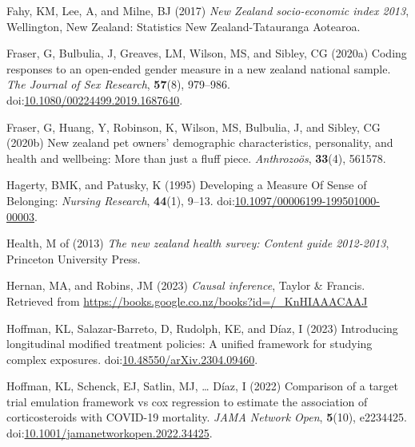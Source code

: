 \documentclass[
  singlecolumn,
  9pt]{article}
\newlength{\cslhangindent}
\newlength{\cslentryspacingunit} %
\newenvironment{CSLReferences}[2] %
 {%
  \setlength{\parindent}{0pt}
  \ifodd #1
  \let\oldpar\par
  \def\par{\hangindent=\cslhangindent\oldpar}
  \fi
  \setlength{\parskip}{#2\cslentryspacingunit}
 }%
 {}
\begin{document}
\begin{CSLReferences}{1}{0}
\leavevmode{}%
Fahy, KM, Lee, A, and Milne, BJ (2017) \emph{New Zealand socio-economic
index 2013}, Wellington, New Zealand: Statistics New Zealand-Tatauranga
Aotearoa.

\leavevmode{}%
Fraser, G, Bulbulia, J, Greaves, LM, Wilson, MS, and Sibley, CG (2020a)
Coding responses to an open-ended gender measure in a new zealand
national sample. \emph{The Journal of Sex Research}, \textbf{57}(8),
979--986.
doi:\href{https://doi.org/10.1080/00224499.2019.1687640}{10.1080/00224499.2019.1687640}.

\leavevmode{}%
Fraser, G, Huang, Y, Robinson, K, Wilson, MS, Bulbulia, J, and Sibley,
CG (2020b) New zealand pet owners{'} demographic characteristics,
personality, and health and wellbeing: More than just a fluff piece.
\emph{Anthrozoös}, \textbf{33}(4), 561578.

\leavevmode{}%
Hagerty, BMK, and Patusky, K (1995) Developing a Measure Of Sense of
Belonging: \emph{Nursing Research}, \textbf{44}(1), 9--13.
doi:\href{https://doi.org/10.1097/00006199-199501000-00003}{10.1097/00006199-199501000-00003}.

\leavevmode{}%
Health, M of (2013) \emph{The new zealand health survey: Content guide
2012-2013}, Princeton University Press.

\leavevmode{}%
Hernan, MA, and Robins, JM (2023) \emph{Causal inference}, Taylor \&
Francis. Retrieved from
\url{https://books.google.co.nz/books?id=/_KnHIAAACAAJ}

\leavevmode{}%
Hoffman, KL, Salazar-Barreto, D, Rudolph, KE, and Díaz, I (2023)
Introducing longitudinal modified treatment policies: A unified
framework for studying complex exposures.
doi:\href{https://doi.org/10.48550/arXiv.2304.09460}{10.48550/arXiv.2304.09460}.

\leavevmode{}%
Hoffman, KL, Schenck, EJ, Satlin, MJ, \ldots{} Díaz, I (2022) Comparison
of a target trial emulation framework vs cox regression to estimate the
association of corticosteroids with COVID-19 mortality. \emph{JAMA
Network Open}, \textbf{5}(10), e2234425.
doi:\href{https://doi.org/10.1001/jamanetworkopen.2022.34425}{10.1001/jamanetworkopen.2022.34425}.


\end{CSLReferences}
\end{document}
